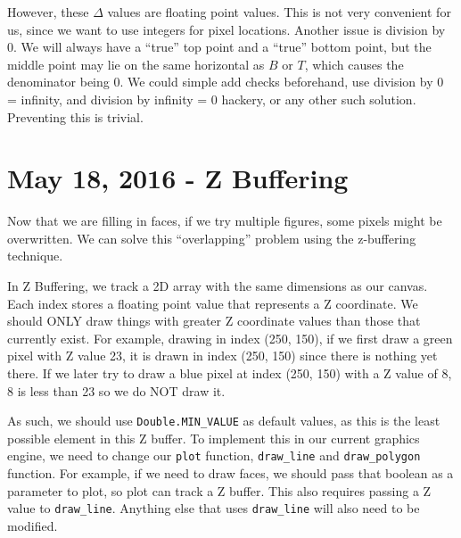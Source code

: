 \documentclass[11pt,fleqn]{article}
\theoremstyle{definition}
\begin{document}
However, these $\Delta$ values are floating point values. This is not very convenient
for us, since we want to use integers for pixel locations. Another issue is division
by 0. We will always have a ``true'' top point and a ``true'' bottom point, but the
middle point may lie on the same horizontal as $B$ or $T$, which causes the
denominator being 0. We could simple add checks beforehand, use division by 0 =
infinity, and division by infinity = 0 hackery, or any other such solution.
Preventing this is trivial.

\section{May 18, 2016 - Z Buffering}

Now that we are filling in faces, if we try multiple figures, some pixels might be
overwritten. We can solve this ``overlapping'' problem using the z-buffering
technique.

In Z Buffering, we track a 2D array with the same dimensions as our canvas. Each
index stores a floating point value that represents a Z coordinate. We should ONLY
draw things with greater Z coordinate values than those that currently exist. For
example, drawing in index (250, 150), if we first draw a green pixel with Z value 23,
it is drawn in index (250, 150) since there is nothing yet there. If we later try to
draw a blue pixel at index (250, 150) with a Z value of 8, 8 is less than 23 so we do
NOT draw it.

As such, we should use \texttt{Double.MIN\_VALUE} as default values, as this is the
least possible element in this Z buffer. To implement this in our current graphics
engine, we need to change our \texttt{plot} function, \texttt{draw\_line} and
\texttt{draw\_polygon} function. For example, if we need to draw faces, we should
pass that boolean as a parameter to plot, so plot can track a Z buffer. This also
requires passing a Z value to \texttt{draw\_line}. Anything else that uses
\texttt{draw\_line} will also need to be modified.
\end{document}
